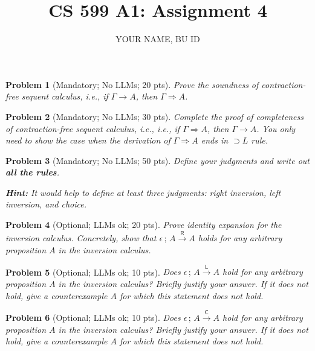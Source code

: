\documentclass{article}
\title{CS 599 A1: Assignment 4}
\author{YOUR NAME, BU ID}
\date{}
\newcommand{\m}[1]{\mathsf{#1}}
\newcommand{\G}{\Gamma}
\newcommand{\semi}{\,;\,}
\newcommand{\limpl}{\supset}
\newcommand{\seq}{\Longrightarrow}
\newcommand{\cseq}{\longrightarrow}
\newcommand{\irseq}{\overset{\m{R}}{\longrightarrow}}
\newcommand{\ilseq}{\overset{\m{L}}{\longrightarrow}}
\newcommand{\icseq}{\overset{\m{C}}{\longrightarrow}}
\newtheorem{problem}{Problem}
\begin{document}
\maketitle


\begin{problem}[Mandatory; No LLMs; 20 pts]
    Prove the soundness of contraction-free sequent calculus, i.e., if $\G \cseq A$, then $\G \seq A$.
\end{problem}

\begin{problem}[Mandatory; No LLMs; 30 pts]
Complete the proof of completeness of contraction-free sequent calculus, i.e.,
i.e., if $\G \seq A$, then $\G \cseq A$.
You only need to show the case when the derivation of $\G \seq A$ ends in $\limpl L$ rule.
\end{problem}

\begin{problem}[Mandatory; No LLMs; 50 pts]
Define your judgments and write out \textbf{all the rules}.

\textbf{Hint:} It would help to define at least three judgments:
right inversion, left inversion, and choice.
\end{problem}

\begin{problem}[Optional; LLMs ok; 20 pts]
Prove identity expansion for the inversion calculus. Concretely, show that $\epsilon \semi A \irseq A$
holds for any arbitrary proposition $A$ in the inversion calculus.
\end{problem}

\begin{problem}[Optional; LLMs ok; 10 pts]
Does $\epsilon \semi A \ilseq A$ hold for any arbitrary proposition $A$ in the inversion calculus?
Briefly justify your answer. If it does not hold, give a counterexample $A$ for which this statement
does not hold.
\end{problem}

\begin{problem}[Optional; LLMs ok; 10 pts]
Does $\epsilon \semi A \icseq A$ hold for any arbitrary proposition $A$ in the inversion calculus?
Briefly justify your answer. If it does not hold, give a counterexample $A$ for which this statement
does not hold.
\end{problem}
\end{document}
